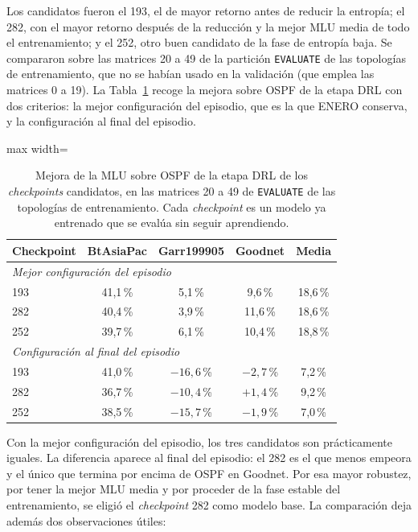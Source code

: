 Los candidatos fueron el 193, el de mayor retorno antes de reducir la entropía; el 282, con el mayor retorno después de la reducción y la mejor MLU media de todo el entrenamiento; y el 252, otro buen candidato de la fase de entropía baja. Se compararon sobre las matrices 20 a 49 de la partición \texttt{EVALUATE} de las topologías de entrenamiento, que no se habían usado en la validación (que emplea las matrices 0 a 19). La Tabla~\ref{tab:res_seleccion} recoge la mejora sobre OSPF de la etapa DRL con dos criterios: la mejor configuración del episodio, que es la que ENERO conserva, y la configuración al final del episodio.

\begin{table}[H]
	\centering
	\footnotesize
	\begin{adjustbox}{max width=\textwidth}
	\begin{tabular}{lcccc}
		\toprule
		\textbf{Checkpoint} & \textbf{BtAsiaPac} & \textbf{Garr199905} & \textbf{Goodnet} & \textbf{Media} \\
		\midrule
		\multicolumn{5}{l}{\textit{Mejor configuración del episodio}} \\
		193 & 41,1\,\% & 5,1\,\% & 9,6\,\% & 18,6\,\% \\
		282 & 40,4\,\% & 3,9\,\% & 11,6\,\% & 18,6\,\% \\
		252 & 39,7\,\% & 6,1\,\% & 10,4\,\% & 18,8\,\% \\
		\midrule
		\multicolumn{5}{l}{\textit{Configuración al final del episodio}} \\
		193 & 41,0\,\% & $-16{,}6$\,\% & $-2{,}7$\,\% & 7,2\,\% \\
		282 & 36,7\,\% & $-10{,}4$\,\% & $+1{,}4$\,\% & 9,2\,\% \\
		252 & 38,5\,\% & $-15{,}7$\,\% & $-1{,}9$\,\% & 7,0\,\% \\
		\bottomrule
	\end{tabular}
	\end{adjustbox}
	\caption[Mejora sobre OSPF de los checkpoints candidatos]{Mejora de la MLU sobre OSPF de la etapa DRL de los \textit{checkpoints} candidatos, en las matrices 20 a 49 de \texttt{EVALUATE} de las topologías de entrenamiento. Cada \textit{checkpoint} es un modelo ya entrenado que se evalúa sin seguir aprendiendo.}
	\label{tab:res_seleccion}
\end{table}

Con la mejor configuración del episodio, los tres candidatos son prácticamente iguales. La diferencia aparece al final del episodio: el 282 es el que menos empeora y el único que termina por encima de OSPF en Goodnet. Por esa mayor robustez, por tener la mejor MLU media y por proceder de la fase estable del entrenamiento, se eligió el \textit{checkpoint} 282 como modelo base. La comparación deja además dos observaciones útiles:

